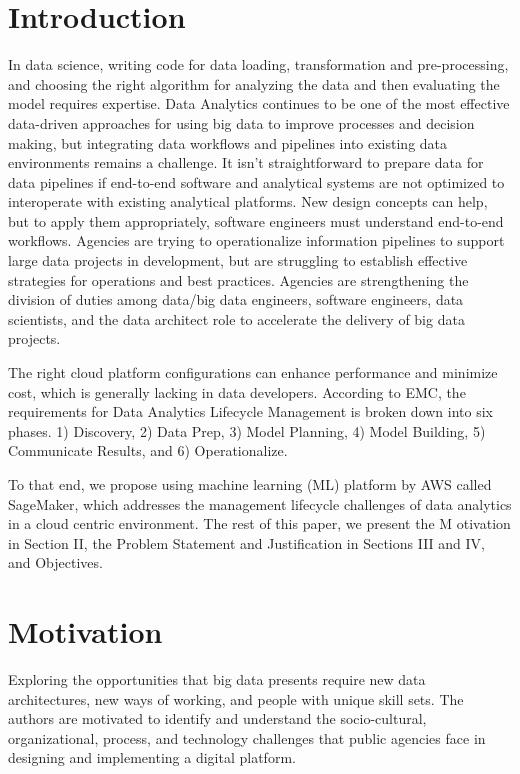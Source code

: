 \documentclass[conference]{IEEEtran}
\begin{document}
\section{Introduction}
In data science, writing code for data loading, transformation and pre-processing, and choosing the right algorithm for analyzing the data and then evaluating the model requires expertise.  Data Analytics continues to be one of the most effective data-driven approaches for using big data to improve processes and decision making, but integrating data workflows and pipelines into existing data environments remains a challenge. It isn't straightforward to prepare data for data pipelines if end-to-end software and analytical systems are not optimized to interoperate with existing analytical platforms. New design concepts can help, but to apply them appropriately, software engineers must understand end-to-end workflows.  Agencies are trying to operationalize information pipelines to support large data projects in development, but are struggling to establish effective strategies for operations and best practices.  Agencies are strengthening the division of duties among data/big data engineers, software engineers, data scientists, and the data architect role to accelerate the delivery of big data projects. 

The right cloud platform configurations can enhance performance and minimize cost, which is generally lacking in data developers. According to EMC\cite{EMC}, the requirements for Data Analytics Lifecycle Management is broken down into six phases. 1) Discovery, 2) Data Prep, 3) Model Planning, 4) Model Building, 5) Communicate Results, and 6) Operationalize.

To that end, we propose using machine learning (ML) platform by AWS called SageMaker\cite{SageMaker}, which addresses the management lifecycle challenges of data analytics in a cloud centric environment.  The rest of this paper, we present the M otivation in Section II, the Problem Statement and Justification in Sections III and IV, and Objectives.
%
%
%
\section{Motivation}
Exploring the opportunities that big data presents require new data architectures,  new ways of working, and people with unique skill sets. The authors are motivated to identify and understand the socio-cultural, organizational, process, and technology challenges that public agencies face in designing and implementing a digital platform.  
\end{document}
